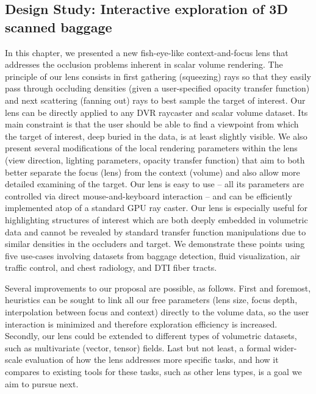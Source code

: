 \subsection{ Design Study: Interactive exploration of 3D scanned baggage } 
In this chapter, we presented a new fish-eye-like context-and-focus lens that addresses the occlusion problems inherent in scalar volume rendering. The principle of our lens consists in first gathering (squeezing) rays so that they easily pass through occluding densities (given a user-specified opacity transfer function) and next scattering (fanning out) rays to best sample the target of interest. Our lens can be directly applied to any DVR raycaster and scalar volume dataset. Its main constraint is that the user should be able to find a viewpoint from which the target of interest, deep buried in the data, is at least slightly visible. We also present several modifications of the local rendering parameters within the lens (view direction, lighting parameters, opacity transfer function) that aim to both better separate the focus (lens) from the context (volume) and also allow more detailed examining of the target. Our lens is easy to use -- all its parameters are controlled via direct mouse-and-keyboard interaction -- and can be efficiently implemented atop of a standard GPU ray caster. Our lens is especially useful for highlighting structures of interest which are both deeply embedded in volumetric data and cannot be revealed by standard transfer function manipulations due to similar densities in the occluders and target. We demonstrate these points using five use-cases involving datasets from baggage detection, fluid visualization, air traffic control, and chest radiology, and DTI fiber tracts.

Several improvements to our proposal are possible, as follows. First and foremost, heuristics can be sought to link all our free parameters (lens size, focus depth, interpolation between focus and context) directly to the volume data, so the user interaction is minimized and therefore exploration efficiency is increased. Secondly, our lens could be extended to different types of volumetric datasets, such as multivariate (vector, tensor) fields. Last but not least, a formal wider-scale evaluation of how the lens addresses more specific tasks, and how it compares to existing tools for these tasks, such as other lens types, is a goal we aim to pursue next.